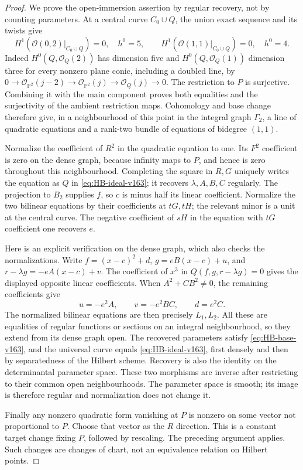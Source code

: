 \documentclass[11pt,reqno]{amsart}
\numberwithin{equation}{section}
\theoremstyle{definition}\newtheorem{definition}[theorem]{Definition}
\theoremstyle{remark}\newtheorem{remark}[theorem]{Remark}
\newcommand{\Pj}{\mathbb P}\newcommand{\A}{\mathbb A}
\newcommand{\OO}{\mathcal O}\newcommand{\II}{\mathcal I}
\begin{document}
\begin{proof}
We prove the open-immersion assertion by regular recovery, not by
counting parameters. At a central curve $C_0\cup Q$, the union exact
sequence and its twists give
\[
 H^1(\OO(0,2)|_{C_0\cup Q})=0,\quad h^0=5,
 \qquad H^1(\OO(1,1)|_{C_0\cup Q})=0,\quad h^0=4.
\]
Indeed $H^0(Q,\OO_Q(2))$ has dimension five and
$H^0(Q,\OO_Q(1))$ dimension three for every nonzero plane conic,
including a doubled line, by
$0\to\OO_{\Pj^2}(j-2)\to\OO_{\Pj^2}(j)\to\OO_Q(j)\to0$.
The restriction to $P$ is surjective. Combining it with the main
component proves both equalities and the surjectivity of the ambient
restriction maps. Cohomology and base change therefore give, in a
neighbourhood of this point in the integral graph $\Gamma_2$, a line
of quadratic equations and a rank-two bundle of equations of bidegree
$(1,1)$.

Normalize the coefficient of $R^2$ in the quadratic equation to one.
Its $F^2$ coefficient is zero on the dense graph, because infinity
maps to $P$, and hence is zero throughout this neighbourhood.
Completing the square in $R,G$ uniquely writes the equation as $Q$
in \eqref{eq:HB-ideal-v163}; it recovers
$\lambda,A,B,C$ regularly. The projection to $B_2$ supplies $f$,
so $c$ is minus half its linear coefficient. Normalize the two
bilinear equations by their coefficients at $tG,tH$; the relevant
minor is a unit at the central curve. The negative coefficient of
$sH$ in the equation with $tG$ coefficient one recovers $e$.

Here is an explicit verification on the dense graph, which also
checks the normalizations. Write $f=(x-c)^2+d$,
$g=eB(x-c)+u$, and $r-\lambda g=-eA(x-c)+v$. The coefficient of
$x^3$ in $Q(f,g,r-\lambda g)=0$ gives the displayed opposite linear
coefficients. When $A^2+CB^2\ne0$, the remaining coefficients give
\[
 u=-e^2A,\qquad v=-e^2BC,\qquad d=e^2C.
\]
The normalized bilinear equations are then precisely $L_1,L_2$.
All these are equalities of regular functions or sections on an
integral neighbourhood, so they extend from its dense graph open.
The recovered parameters satisfy \eqref{eq:HB-base-v163}, and the
universal curve equals \eqref{eq:HB-ideal-v163}, first densely and
then by separatedness of the Hilbert scheme. Recovery is also the
identity on the determinantal parameter space. These two morphisms
are inverse after restricting to their common open neighbourhoods.
The parameter space is smooth; its image is therefore regular and
normalization does not change it.

Finally any nonzero quadratic form vanishing at $P$ is nonzero on
some vector not proportional to $P$. Choose that vector as the $R$
direction. This is a constant target change fixing $P$, followed by
rescaling. The preceding argument applies. Such changes are changes
of chart, not an equivalence relation on Hilbert points.
\end{proof}
\end{document}
